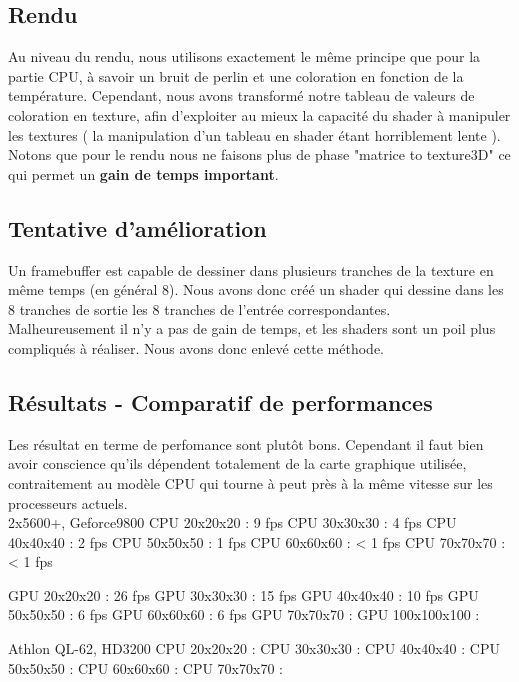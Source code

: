 \documentclass[a4paper,10pt]{article}
\begin{document}
 
\subsection{Rendu}
Au niveau du rendu, nous utilisons exactement le même principe que pour la partie CPU,
à savoir un bruit de perlin et une coloration en fonction de la température.
Cependant, nous avons transformé notre tableau de valeurs de coloration en texture,
afin d'exploiter au mieux la capacité du shader à manipuler les textures ( la manipulation
d'un tableau en shader étant horriblement lente ).
Notons que pour le rendu nous ne faisons plus de phase "matrice to texture3D" ce qui permet
un \textbf{gain de temps important}.

 
\subsection{Tentative d'amélioration}
Un framebuffer est capable de dessiner dans plusieurs tranches de la
texture en même temps (en général 8). Nous avons donc créé un shader qui dessine
dans les 8 tranches de sortie les 8 tranches de l'entrée
correspondantes.\\
Malheureusement il n'y a pas de gain de temps, et les shaders sont
un poil plus compliqués à réaliser. Nous avons donc enlevé cette méthode.

\subsection{Résultats - Comparatif de performances}
Les résultat en terme de perfomance sont plutôt bons. Cependant il faut
bien avoir conscience qu'ils dépendent totalement de la carte graphique utilisée,
contraitement au modèle CPU qui tourne à peut près à la même vitesse sur les processeurs
actuels.\\


2x5600+, Geforce9800
  CPU 20x20x20      : 9 fps
  CPU 30x30x30      : 4 fps
  CPU 40x40x40      : 2 fps
  CPU 50x50x50      : 1 fps
  CPU 60x60x60      : < 1 fps
  CPU 70x70x70      : < 1 fps
  
  GPU 20x20x20      : 26 fps
  GPU 30x30x30      : 15 fps
  GPU 40x40x40      : 10 fps
  GPU 50x50x50      : 6 fps
  GPU 60x60x60      : 6 fps
  GPU 70x70x70      :
  GPU 100x100x100   :
  
 Athlon QL-62, HD3200
  CPU 20x20x20      :
  CPU 30x30x30      : 
  CPU 40x40x40      : 
  CPU 50x50x50      :
  CPU 60x60x60      :
  CPU 70x70x70      : 
  
\end{document}
